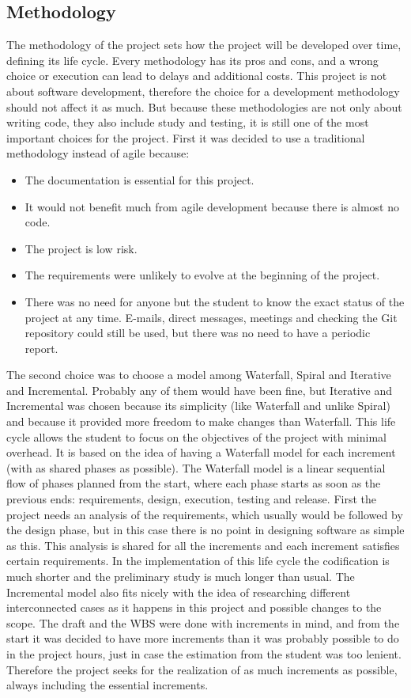 \subsection{Methodology}
The methodology of the project sets how the project will be developed over time, defining its life cycle.
Every methodology has its pros and cons, and a wrong choice or execution can lead to delays and additional costs.
\linej
This project is not about software development, therefore the choice for a development methodology should not affect it as much.
But because these methodologies are not only about writing code, they also include study and testing, it is still one of the most important choices for the project.
\linej
\linej
First it was decided to use a traditional methodology instead of agile because:
\begin{itemize}
	\item The documentation is essential for this project.
	\item It would not benefit much from agile development because there is almost no code.
	\item The project is low risk.
	\item The requirements were unlikely to evolve at the beginning of the project.
	\item There was no need for anyone but the student to know the exact status of the project at any time. E-mails, direct messages, meetings and checking the Git repository could still be used, but there was no need to have a periodic report.
\end{itemize}
\linej
The second choice was to choose a model among Waterfall, Spiral and Iterative and Incremental.
Probably any of them would have been fine, but Iterative and Incremental was chosen because its simplicity (like Waterfall and unlike Spiral) and because it provided more freedom to make changes than Waterfall.
\linej
\linej
This life cycle allows the student to focus on the objectives of the project with minimal overhead.
It is based on the idea of having a Waterfall model for each increment (with as shared phases as possible).
The Waterfall model is a linear sequential flow of phases planned from the start, where each phase starts as soon as the previous ends: requirements, design, execution, testing and release.
\linej
\linej
First the project needs an analysis of the requirements, which usually would be followed by the design phase, but in this case there is no point in designing software as simple as this.
This analysis is shared for all the increments and each increment satisfies certain requirements.
\linej
In the implementation of this life cycle the codification is much shorter and the preliminary study is much longer than usual.
\linej
\linej
The Incremental model also fits nicely with the idea of researching different interconnected cases as it happens in this project and possible changes to the scope.
The draft and the WBS were done with increments in mind, and from the start it was decided to have more increments than it was probably possible to do in the project hours, just in case the estimation from the student was too lenient.
Therefore the project seeks for the realization of as much increments as possible, always including the essential increments.

